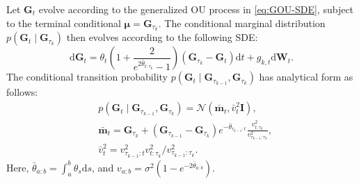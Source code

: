 \begin{customthe}
%
Let $\bm{G}_t$ evolve according to the generalized OU process in \cref{eq:GOU-SDE}, subject to the terminal conditional $\bm{\mu}=\bm{G}_{\tau_k}$. 
%
The conditional marginal distribution $p(\bm{G}_t\mid\bm{G}_{\tau_k})$ then evolves according to the following SDE:
\begin{equation}
\mathrm{d}\bm{G}_t = \theta_t \left( 1 + \frac{2}{e^{2\bar{\theta}_{t:\tau_k}}-1}  \right)(\bm{G}_{\tau_k} - \bm{G}_t)  \mathrm{d}t 
+ g_{k,t} \mathrm{d}\bm{W}_t.
\label{eq:GOUB-SDE}
\end{equation}
The conditional transition probability $p(\bm{G}_t \mid \bm{G}_{\tau_{k-1}}, \bm{G}_{\tau_k})$ has analytical form as follows:
\begin{equation}
\begin{split}
&p(\bm{G}_t \mid  \bm{G}_{\tau_{k-1}}, \bm{G}_{\tau_k}) 
= \mathcal{N}(\bar{\mathbf{m}}_t, \bar{v}_t^2 \bm{I}),\\
&\bar{\mathbf{m}}_t = 
\bm{G}_{\tau_k} + (\bm{G}_{\tau_{k-1}}-\bm{G}_{\tau_k})e^{-\bar{\theta}_{\tau_{k-1}:t}} 
\frac{v_{t:\tau_k}^2}{v_{\tau_{k-1}:\tau_k}^2}, \\
&\bar{v}_t^2 = {v_{\tau_{k-1}:t}^2 v_{t:\tau_k}^2}/{v_{\tau_{k-1}:\tau_k}^2}.
\end{split}
\end{equation}
Here, $\bar{\theta}_{a:b}=\int_a^b \theta_s  \mathrm{d}s$, and $v_{a:b}=\sigma^2(1-e^{-2\bar{\theta}_{a:b}})$.
\end{customthe}

